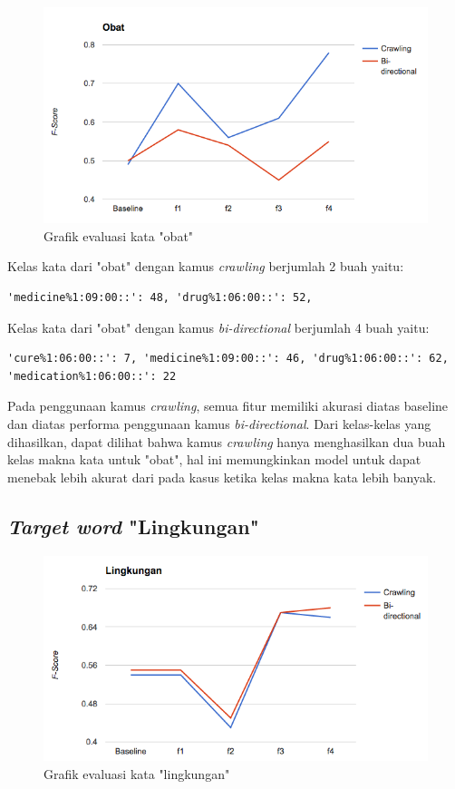 \begin{figure}
	\centering
	\includegraphics[width=1\linewidth]{adit_pics/obat.png}
	\caption{Grafik evaluasi kata "obat"}
	\label{fig:obat}
\end{figure}

Kelas kata dari "obat" dengan kamus \textit{crawling} berjumlah 2 buah yaitu:
\begin{lstlisting}
'medicine%1:09:00::': 48, 'drug%1:06:00::': 52, 
\end{lstlisting}
Kelas kata dari "obat" dengan kamus \textit{bi-directional} berjumlah 4 buah yaitu:
\begin{lstlisting}
'cure%1:06:00::': 7, 'medicine%1:09:00::': 46, 'drug%1:06:00::': 62, 'medication%1:06:00::': 22
\end{lstlisting}

Pada penggunaan kamus \textit{crawling}, semua fitur memiliki akurasi diatas baseline dan diatas performa penggunaan kamus \textit{bi-directional}. Dari kelas-kelas yang dihasilkan, dapat dilihat bahwa kamus \textit{crawling} hanya menghasilkan dua buah kelas makna kata untuk "obat", hal ini memungkinkan model untuk dapat menebak lebih akurat dari pada kasus ketika kelas makna kata lebih banyak.

\subsection{\textit{Target word} "Lingkungan"}

\begin{figure}
	\centering
	\includegraphics[width=1\linewidth]{adit_pics/lingkungan.png}
	\caption{Grafik evaluasi kata "lingkungan"}
	\label{fig:halaman}
\end{figure}

